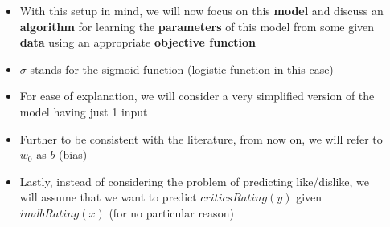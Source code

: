 \begin{frame}
\end{frame}

\begin{frame}
	\begin{columns}
		\begin{overlayarea}{\textwidth}{\textheight}
			\only<1-2>{
				\begin{center}
					
				\end{center}
			}
			\only<3->{
				\begin{center}
					
				\end{center}
			}
		\end{overlayarea}
		\begin{overlayarea}{\textwidth}{\textheight}
			\begin{itemize}\justifying
				\item<1-> With this setup in mind, we will now focus on this \textbf{model} and discuss an \textbf{algorithm} for learning the \textbf{parameters} of this model from some given \textbf{data} using an appropriate \textbf{objective function}
				\item<2-> $\sigma$ stands for the sigmoid function (logistic function in this case)
				\item<3-> For ease of explanation, we will consider a very simplified version of the model having just 1 input
				\item<4-> Further to be consistent with the literature, from now on, we will refer to $w_0$ as $b$ (bias)
				\item<5-> Lastly, instead of considering the problem of predicting like/dislike, we will assume that we want to predict $criticsRating (y)$ given  $imdbRating (x)$ (for no particular reason)
			\end{itemize}
		\end{overlayarea}
	\end{columns}
\end{frame}

